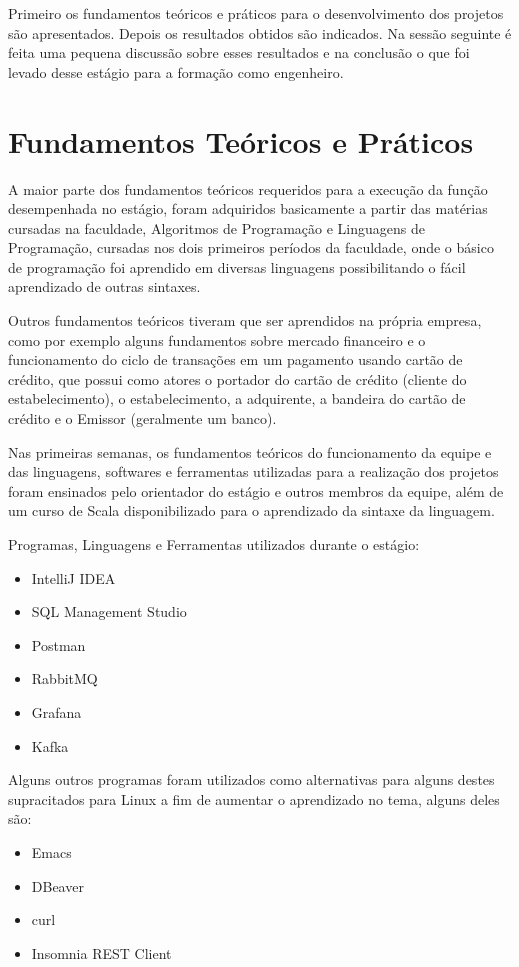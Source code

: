 \documentclass[a4paper]{article}
\begin{document}
Primeiro os fundamentos teóricos e práticos para o
desenvolvimento dos projetos são apresentados. Depois os resultados
obtidos são indicados. Na sessão seguinte é feita uma pequena
discussão sobre esses resultados e na conclusão o que foi levado desse
estágio para a formação como engenheiro.

\section{Fundamentos Teóricos e Práticos}
A maior parte dos fundamentos teóricos requeridos para a execução da função
desempenhada no estágio, foram adquiridos basicamente a partir das
matérias cursadas na faculdade, Algoritmos de Programação e Linguagens
de Programação, cursadas nos dois primeiros períodos da
faculdade, onde o básico de programação foi aprendido em diversas
linguagens possibilitando o fácil aprendizado de outras sintaxes.

Outros fundamentos teóricos tiveram que ser aprendidos na própria
empresa, como por exemplo alguns fundamentos sobre mercado financeiro
e o funcionamento do ciclo de transações em um pagamento usando cartão
de crédito, que possui como atores o portador do cartão de crédito (cliente do
estabelecimento), o estabelecimento, a adquirente, a bandeira do
cartão de crédito e o Emissor (geralmente um banco).

Nas primeiras semanas, os fundamentos teóricos do funcionamento da
equipe e das linguagens, softwares e ferramentas utilizadas para a realização dos projetos foram
ensinados pelo orientador do estágio e outros membros da equipe, além
de um curso de Scala disponibilizado para o aprendizado da sintaxe da
linguagem.

Programas, Linguagens e Ferramentas utilizados durante o estágio:

\begin{itemize}
\item IntelliJ IDEA
\item SQL Management Studio
\item Postman
\item RabbitMQ
\item Grafana
\item Kafka
\end{itemize}

Alguns outros programas foram utilizados como alternativas para alguns
destes supracitados para Linux a fim de aumentar o aprendizado no tema, alguns deles
são:
\begin{itemize}
\item Emacs
\item DBeaver 
\item curl
\item Insomnia REST Client
\end{itemize}
\pagebreak
\end{document}
